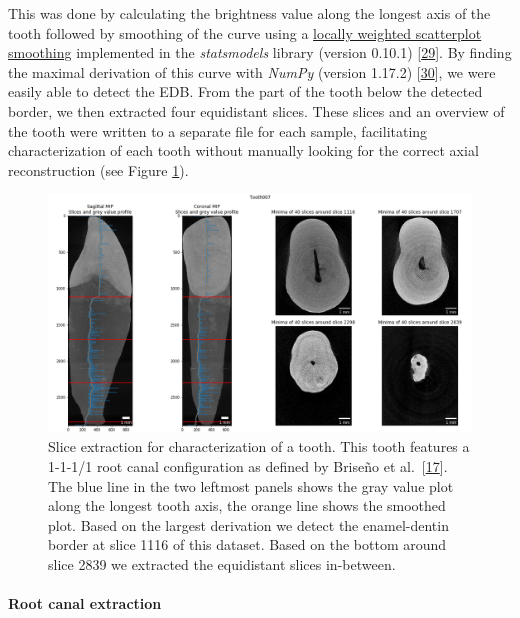 \documentclass[
  american,
]{article}
\begin{document}
This was done by calculating the brightness value along the longest axis of the tooth followed by smoothing of the curve using a \href{https://www.statsmodels.org/devel/generated/statsmodels.nonparametric.smoothers_lowess.lowess.html}{locally weighted scatterplot smoothing} implemented in the \emph{statsmodels} library (version 0.10.1) {[}\protect\hyperlink{ref-E4OYV0qi}{29}{]}.
By finding the maximal derivation of this curve with \emph{NumPy} (version 1.17.2) {[}\protect\hyperlink{ref-OiM2HfsY}{30}{]}, we were easily able to detect the EDB.
From the part of the tooth below the detected border, we then extracted four equidistant slices.
These slices and an overview of the tooth were written to a separate file for each sample, facilitating characterization of each tooth without manually looking for the correct axial reconstruction (see Figure \ref{fig:extractedslices}).

\begin{figure}
\hypertarget{fig:extractedslices}{%
\centering
\includegraphics{images/ExtractedSlices.png}
\caption{Slice extraction for characterization of a tooth.
This tooth features a 1-1-1/1 root canal configuration as defined by Briseño et al.~{[}\protect\hyperlink{ref-ZTgDEakx}{17}{]}.
The blue line in the two leftmost panels shows the gray value plot along the longest tooth axis, the orange line shows the smoothed plot.
Based on the largest derivation we detect the enamel-dentin border at slice 1116 of this dataset.
Based on the bottom around slice 2839 we extracted the equidistant slices in-between.}\label{fig:extractedslices}
}
\end{figure}

\hypertarget{root-canal-extraction}{%
\paragraph{Root canal extraction}\label{root-canal-extraction}}
\end{document}

